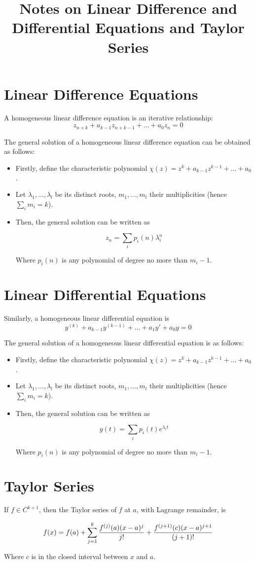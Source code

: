 \documentclass[20pt]{article} %
\title{Notes on Linear Difference and Differential Equations and Taylor Series}
\theoremstyle{break}
\begin{document}
\maketitle

\section{Linear Difference Equations}

A homogeneous linear difference equation is an iterative relationship:
\[z_{n+k}+a_{k-1}z_{n+k-1}+\dots+a_0z_n=0\]

The general solution of a homogeneous linear difference equation can be obtained as follows:
\begin{itemize}
\item Firstly, define the characteristic polynomial $\chi(z)=z^k+a_{k-1}z^{k-1}+\dots+a_0$.
\item Let $\lambda_1, \dots, \lambda_l$ be its distinct roots, $m_1, \dots, m_l$ their multiplicities (hence $\sum_im_i=k$).
\item Then, the general solution can be written as

\[z_n=\sum_ip_i(n)\lambda_i^n\]

Where $p_i(n)$ is any polynomial of degree no more than $m_i-1$.
\end{itemize}

\section{Linear Differential Equations}

Similarly, a homogeneous linear differential equation is
\[y^{(k)}+a_{k-1}y^{(k-1)}+\dots+a_1y'+a_0y=0\]

The general solution of a homogeneous linear differential equation is as follows:
\begin{itemize}
\item Firstly, define the characteristic polynomial $\chi(z)=z^k+a_{k-1}z^{k-1}+\dots+a_0$.
\item Let $\lambda_1, \dots, \lambda_l$ be its distinct roots, $m_1, \dots, m_l$ their multiplicities (hence $\sum_im_i=k$).
\item Then, the general solution can be written as

\[y(t)=\sum_ip_i(t)e^{\lambda_i t}\]

Where $p_i(n)$ is any polynomial of degree no more than $m_i-1$.
\end{itemize}


\section{Taylor Series}

If $f\in C^{k+1}$, then the Taylor series of $f$ at $a$, with Lagrange remainder, is

\[f(x)=f(a)+\sum_{j=1}^{k}{f^{(j)}(a)(x-a)^j\over j!}+{f^{(j+1)}(c)(x-a)^{j+1}\over(j+1)!}\] 

Where $c$ is in the closed interval between $x$ and $a$.
\end{document}
